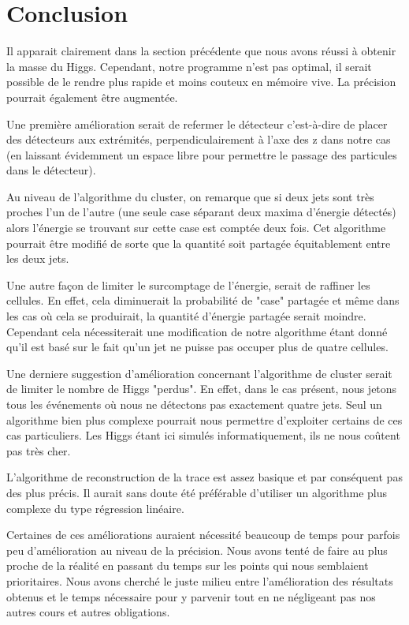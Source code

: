 \documentclass[11pt]{article}
\begin{document}
\newpage
\section{Conclusion}
 Il apparait clairement dans la section pr\'ec\'edente que nous avons r\'eussi \`a obtenir la masse du Higgs.
Cependant, notre programme n'est pas optimal, il serait possible de le rendre plus rapide et 
moins couteux en m\'emoire vive. La pr\'ecision pourrait \'egalement être augment\'ee. 

Une première amélioration serait de refermer le d\'etecteur c'est-à-dire de placer des d\'etecteurs aux extrémités, 
perpendiculairement à l'axe des z dans notre cas (en laissant évidemment un
espace libre pour permettre le passage des 
particules dans le d\'etecteur). 

Au niveau de l'algorithme du cluster, on remarque que si deux jets sont très proches l'un de l'autre (une seule case 
s\'eparant deux maxima d'énergie détectés) alors l'énergie se trouvant sur cette
case est comptée deux fois. Cet algorithme
 pourrait être modifié de sorte que la quantité soit partagée équitablement
entre les deux jets.

Une autre façon de limiter le surcomptage de l'énergie, serait de raffiner les 
cellules. En effet, cela diminuerait la probabilité de "case" partagée et même dans les cas où cela se produirait, la
quantité d'énergie partagée serait moindre. Cependant cela nécessiterait une modification de notre 
algorithme 
étant donné qu'il est basé sur le fait qu'un jet ne puisse pas occuper
plus de quatre cellules.

Une derniere suggestion d'amélioration concernant l'algorithme de cluster serait de limiter le nombre
de Higgs "perdus". En effet, dans le cas présent, nous jetons tous les
événements où nous ne détectons pas exactement quatre jets. Seul un algorithme
bien plus complexe pourrait nous permettre d'exploiter certains de ces cas
particuliers. Les Higgs étant ici simulés informatiquement, ils ne nous coûtent
pas très cher.

L'algorithme de reconstruction de la trace est assez basique et par conséquent
pas des plus précis. Il aurait sans doute
été préférable d'utiliser un algorithme plus complexe du type régression linéaire.


Certaines de ces améliorations auraient nécessité beaucoup de temps 
pour parfois peu d'amélioration au niveau de la précision. Nous avons tenté de
faire au plus proche de la réalité en passant du temps sur les points qui nous
semblaient prioritaires. Nous avons cherché le juste milieu entre l'amélioration
des résultats obtenus et le temps nécessaire pour y parvenir tout en ne
négligeant
pas nos autres cours et autres obligations.


		
\end{document}
